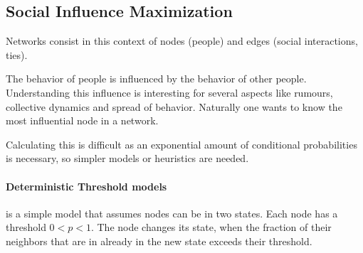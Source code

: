 \subsection{Social Influence Maximization} %
\label{sub:social_influence_maximization}
Networks consist in this context of nodes (people)
and edges (social interactions, ties).

The behavior of people is influenced by the behavior of other people.
Understanding this influence is interesting for several aspects
like rumours, collective dynamics and spread of behavior.
Naturally one wants to know the most influential node in a network.

Calculating this is difficult as an exponential amount of conditional probabilities is necessary,
so simpler models or heuristics are needed.

\paragraph{Deterministic Threshold models} %
\label{par:deterministic_threshold_models}
is a simple model that assumes nodes can be in two states.
Each node has a threshold $0 < p < 1$.
The node changes its state,
when the fraction of their neighbors that are in already in the new state exceeds their threshold.

